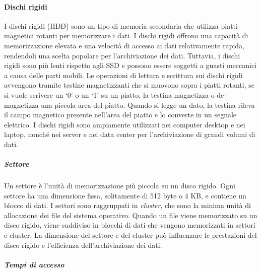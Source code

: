    \paragraph{Dischi rigidi}
        I dischi rigidi (HDD) sono un tipo di memoria secondaria che utilizza piatti magnetici rotanti per memorizzare i dati. I dischi rigidi offrono una capacità di memorizzazione elevata e una velocità di accesso ai dati relativamente rapida, rendendoli una scelta popolare per l'archiviazione dei dati. Tuttavia, i dischi rigidi sono più lenti rispetto agli SSD e possono essere soggetti a guasti meccanici a causa delle parti mobili. Le operazioni di lettura e scrittura sui dischi rigidi avvengono tramite testine magnetizzanti che si muovono sopra i piatti rotanti, se si vuole scrivere un `0' o un `1' su un piatto, la testina magnetizza o de-magnetizza una piccola area del piatto. Quando si legge un dato, la testina rileva il campo magnetico presente nell'area del piatto e lo converte in un segnale elettrico. I dischi rigidi sono ampiamente utilizzati nei computer desktop e nei laptop, nonché nei server e nei data center per l'archiviazione di grandi volumi di dati. 
        \subparagraph{Settore}
            Un settore è l'unità di memorizzazione più piccola su un disco rigido. Ogni settore ha una dimensione fissa, solitamente di 512 byte o 4 KB, e contiene un blocco di dati. I settori sono raggruppati in \textit{cluster}, che sono la minima unità di allocazione dei file del sistema operativo. Quando un file viene memorizzato su un disco rigido, viene suddiviso in blocchi di dati che vengono memorizzati in settori e cluster. La dimensione del settore e del cluster può influenzare le prestazioni del disco rigido e l'efficienza dell'archiviazione dei dati.
        \subparagraph{Tempi di accesso}
